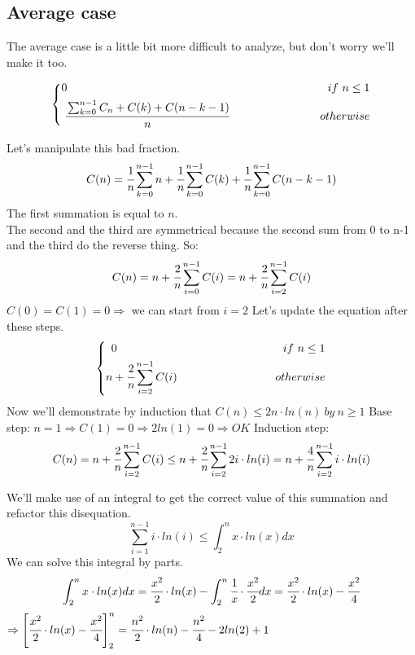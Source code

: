 \documentclass{article}
\begin{document}
\subsection{Average case}
The average case is a little bit more difficult to analyze, but don't worry we'll make it too.\\
\begin{large}
\begin{equation*}
	\left\{ \begin{aligned}
	0 \ \ \ \ \ \ \ \ \ \ \ \ \ \ \ \ \ \ \ \ \ \ \ \ \ \ \ \ \ \ \ \ \ \ \ \ \ \ \ \ \ \ \ \ \  \ \ \ \ \ \ \ \ \ \ \ \ \ \ \ \ \ \ \ \ \ \ \ \ if \ n \leq 1 \\
	\cfrac{\sum_{k=0}^{n-1} C_n + C(k) + C(n-k-1)}{n} \ \ \ \ \ \ \ \ \ \ \ \ \ \ \ \ \ \  \ \ \ \ \ \ otherwise
	\end{aligned} \right.
\end{equation*}

Let's manipulate this bad fraction.\\
$$C(n) = \cfrac{1}{n}\sum_{k=0}^{n-1} n + \cfrac{1}{n}\sum_{k=0}^{n-1}C(k) + \cfrac{1}{n}\sum_{k=0}^{n-1}C(n-k-1)$$
The first summation is equal to $n$.\\
The second and the third are symmetrical because the second sum from 0 to n-1 and the third do the reverse thing. So:\\
$$C(n) = n + \cfrac{2}{n} \sum_{i=0}^{n-1}C(i) = n + \cfrac{2}{n} \sum_{i=2}^{n-1}C(i)$$
$C(0)=C(1)=0 \Rightarrow$ we can start from $i=2$
Let's update the equation after these steps.\\
\begin{equation*}
	\left\{ \begin{aligned}
	0 \ \ \ \ \ \ \ \ \ \ \ \ \ \ \ \ \ \ \ \ \ \ \ \ \ \ \ \ \ \ \ \ \ \ \ \ \ \ \ \ \ \ \ \ if \ n \leq 1 \\
	n + \cfrac{2}{n} \sum_{i=2}^{n-1} C(i) \ \ \ \ \ \ \ \ \ \ \ \ \ \ \ \ \ \  \ \ \ \ \ \ \ \ otherwise
	\end{aligned} \right.
\end{equation*}
Now we'll demonstrate by induction that $C(n) \leq 2n\cdot ln(n) \ by \ n \geq 1$
Base step: $n=1 \Rightarrow C(1) = 0 \Rightarrow 2ln(1) = 0 \Rightarrow OK$
Induction step: $$C(n) = n + \cfrac{2}{n} \sum_{i=2}^{n-1} C(i) \leq n + \cfrac{2}{n} \sum_{i=2}^{n-1} 2i\cdot ln(i) = n + \cfrac{4}{n} \sum_{i=2}^{n-1} i \cdot ln(i)$$

We'll make use of an integral to get the correct value of this summation and refactor this disequation.\\
$$\sum_{i=1}^{n-1} i \cdot ln(i) \leq \int_{2}^{n} x\cdot ln(x) dx$$
We can solve this integral by parts.\\
$$\int_{2}^{n} x\cdot ln(x) dx = \cfrac{x^2}{2} \cdot ln(x) - \int_{2}^{n} \cfrac{1}{x} \cdot \cfrac{x^2}{2} dx = \cfrac{x^2}{2} \cdot ln(x) - \cfrac{x^2}{4}$$
$\Rightarrow \left[\cfrac{x^2}{2} \cdot ln(x) - \cfrac{x^2}{4}\right]_2^n = \cfrac{n^2}{2}\cdot ln(n) - \cfrac{n^2}{4} - 2ln(2) + 1$


\end{large}
\end{document}

